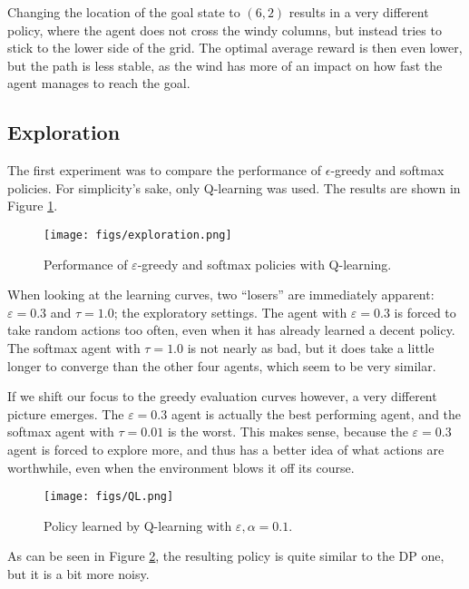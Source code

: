 \documentclass{article}
\begin{document}
Changing the location of the goal state to $(6, 2)$ results in a very different policy, where the agent does not cross the windy columns, but instead tries to stick to the lower side of the grid.
The optimal average reward is then even lower, but the path is less stable, as the wind has more of an impact on how fast the agent manages to reach the goal.

\subsection{Exploration}
\label{ssec:resexpl}

The first experiment was to compare the performance of $\epsilon$-greedy and softmax policies.
For simplicity's sake, only Q-learning was used.
The results are shown in Figure \ref{fig:exploration}.

\begin{figure}[htbp]
    \centering
    \texttt{[image: figs/exploration.png]}
    \caption{Performance of $\varepsilon$-greedy and softmax policies with Q-learning.}
    \label{fig:exploration}
\end{figure}

When looking at the learning curves, two ``losers'' are immediately apparent: $\varepsilon = 0.3$ and $\tau = 1.0$; the exploratory settings.
The agent with $\varepsilon = 0.3$ is forced to take random actions too often, even when it has already learned a decent policy.
The softmax agent with $\tau = 1.0$ is not nearly as bad, but it does take a little longer to converge than the other four agents, which seem to be very similar.

If we shift our focus to the greedy evaluation curves however, a very different picture emerges.
The $\varepsilon = 0.3$ agent is actually the best performing agent, and the softmax agent with $\tau = 0.01$ is the worst.
This makes sense, because the $\varepsilon = 0.3$ agent is forced to explore more, and thus has a better idea of what actions are worthwhile, even when the environment blows it off its course.

\begin{figure}[htbp]
    \centering
    \texttt{[image: figs/QL.png]}
    \caption{Policy learned by Q-learning with $\varepsilon, \alpha = 0.1$.}
    \label{fig:policyQ}
\end{figure}

As can be seen in Figure \ref{fig:policyQ}, the resulting policy is quite similar to the DP one, but it is a bit more noisy.
\end{document}
